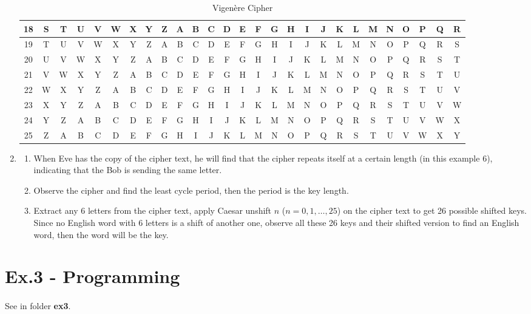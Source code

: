\documentclass[12pt]{article}
\begin{document}
\begin{enumerate}
\begin{table}[h]
{\begin{tabular}{|c|c|c|c|c|c|c|c|c|c|c|c|c|c|c|c|c|c|c|c|c|c|c|c|c|c|c|}
				\hline
				18 & S & T & U & V & W & X & Y & Z & A & B & C & D & E & F & G & H & I & J & K & L & M & N & O & P & Q & R\\
				\hline
				19 & T & U & V & W & X & Y & Z & A & B & C & D & E & F & G & H & I & J & K & L & M & N & O & P & Q & R & S\\
				\hline
				20 & U & V & W & X & Y & Z & A & B & C & D & E & F & G & H & I & J & K & L & M & N & O & P & Q & R & S & T\\
				\hline
				21 & V & W & X & Y & Z & A & B & C & D & E & F & G & H & I & J & K & L & M & N & O & P & Q & R & S & T & U\\
				\hline
				22 & W & X & Y & Z & A & B & C & D & E & F & G & H & I & J & K & L & M & N & O & P & Q & R & S & T & U & V\\
				\hline
				23 & X & Y & Z & A & B & C & D & E & F & G & H & I & J & K & L & M & N & O & P & Q & R & S & T & U & V & W\\
				\hline
				24 & Y & Z & A & B & C & D & E & F & G & H & I & J & K & L & M & N & O & P & Q & R & S & T & U & V & W & X\\
				\hline
				25 & Z & A & B & C & D & E & F & G & H & I & J & K & L & M & N & O & P & Q & R & S & T & U & V & W & X & Y\\
				\hline

			\end{tabular}
		}
		\caption{Vigenère Cipher}
		\label{table:vigenere}
	\end{table}
	\item 
		\begin{enumerate}
			\item When Eve has the copy of the cipher text, he will find that the cipher repeats itself at a certain length (in this example 6), indicating that the Bob is sending the same letter.
			\item Observe the cipher and find the least cycle period, then the period is the key length.
			\item Extract any 6 letters from the cipher text, apply Caesar unshift $n$ ($n=0,1,\ldots ,25$) on the cipher text to get 26 possible shifted keys. Since no English word with 6 letters is a shift of another one, observe all these 26 keys and their shifted version to find an English word, then the word will be the key.
		\end{enumerate}
\end{enumerate}

\section*{Ex.3 - Programming}

\paragraph{}

See in folder {\bf ex3}.
\end{document}
